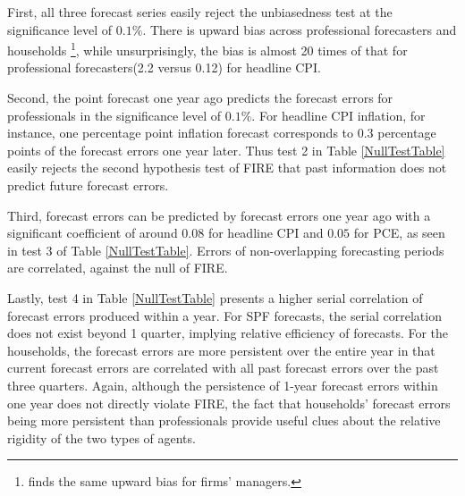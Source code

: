 \documentclass[12pt]{article}
\begin{document}
	First,  all three forecast series easily reject the unbiasedness test at the significance level of $0.1\%$. There is upward bias across professional forecasters and households \footnote{\citet{coibion2018firms} finds the same upward bias for firms' managers.}, while unsurprisingly, the bias is almost 20 times of that for professional forecasters(2.2 versus 0.12) for headline CPI. 
	
	Second, the point forecast one year ago predicts the forecast errors for professionals in the significance level of $0.1\%$. For headline CPI inflation, for instance, one percentage point inflation forecast corresponds to 0.3 percentage points of the forecast errors one year later. Thus test 2 in Table \ref{NullTestTable} easily rejects the second hypothesis test of FIRE that past information does not predict future forecast errors. 
	
	Third, forecast errors can be predicted by forecast errors one year ago with a significant coefficient of around $0.08$ for headline CPI and $0.05$ for PCE, as seen in test 3 of Table \ref{NullTestTable}. Errors of non-overlapping forecasting periods are correlated, against the null of FIRE. 
	
	Lastly, test 4 in Table \ref{NullTestTable} presents a higher serial correlation of forecast errors produced within a year. For SPF forecasts, the serial correlation does not exist beyond 1 quarter, implying relative efficiency of forecasts. For the households, the forecast errors are more persistent over the entire year in that current forecast errors are correlated with all past forecast errors over the past three quarters.  Again, although the persistence of 1-year forecast errors within one year does not directly violate FIRE, the fact that households' forecast errors being more persistent than professionals provide useful clues about the relative rigidity of the two types of agents. 
	
\end{document}
